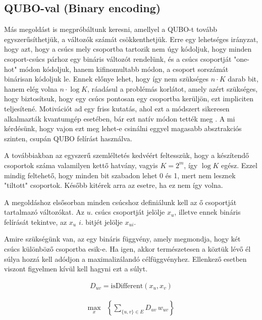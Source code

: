 \subsection{QUBO-val (Binary encoding)}\label{sec:QUBObinary}

Más megoldást is megpróbáltunk keresni, amellyel a QUBO-t tovább egyszerűsíthetjük, a változók számát csökkenthetjük. Erre egy lehetséges irányzat, hogy azt, hogy a csúcs mely csoportba tartozik nem úgy kódoljuk, hogy minden csoport-csúcs párhoz egy bináris változót rendelünk, és a csúcs csoportját "one-hot" módon kódoljuk, hanem kifinomultabb módon, a csoport sorszámát binárisan kódoljuk le. Ennek előnye lehet, hogy így nem szükséges $n \cdot K$ darab bit, hanem elég volna $n \cdot \log K$, ráadásul a problémás korlátot, amely azért szükséges, hogy biztosítsuk, hogy egy csúcs pontosan egy csoportba kerüljön, ezt impliciten teljesítené. Motivációt ad egy friss kutatás, ahol ezt a módszert sikeresen alkalmazták kvantumgép esetében, bár ezt natív módon tették meg  \cite{fuchs2020efficient}. A mi kérdésünk, hogy vajon ezt meg lehet-e csinálni eggyel magasabb absztrakciós szinten, csupán QUBO felírást használva.

A továbbiakban az egyszerű szemléltetés kedvéért feltesszük, hogy a készítendő csoportok száma valamilyen kettő hatvány, vagyis $K=2^m$, így $\log K$ egész. Ezzel mindig feltehető, hogy minden bit szabadon lehet 0 és 1, mert nem lesznek "tiltott" csoportok. Később kitérek arra az esetre, ha ez nem így volna.

A megoldáshoz elsősorban minden csúcshoz definiálunk kell az ő csoportját tartalmazó változókat. Az $u.$ csúcs csoportját jelölje $x_u$, illetve ennek bináris felírását tekintve, az $x_u$ $i.$ bitjét jelölje $x_{ui}$.

Amire szükségünk van, az egy bináris függvény, amely megmondja, hogy két csúcs különböző csoportba esik-e. Ha igen, akkor természetesen a köztük lévő él súlya hozzá kell adódjon a maximalizálandó célfüggvényhez. Ellenkező esetben viszont figyelmen kívül kell hagyni ezt a súlyt.

\begin{align}
D_{uv} = \text{isDifferent}(x_u,x_v)
\end{align}

\begin{align} 
	\max_{x} & \left\{\sum _{\{u,v\} \in E } D_{uv} \, w_{uv} \right\} 
\end{align}

